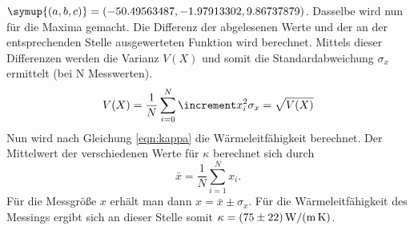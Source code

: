 $\symup{(a,b,c)}=(-50.49563487, -1.97913302, 9.86737879)$.
Dasselbe wird nun für die Maxima gemacht.
Die Differenz der abgelesenen Werte und der an der entsprechenden Stelle ausgewerteten Funktion wird berechnet. 
Mittels dieser Differenzen werden die Varianz $V(X)$ und somit die Standardabweichung $\sigma_x$ ermittelt (bei N Messwerten). 
\begin{equation*}
V(X)= \frac{1}{N} \sum_{i=0}^N \increment x_i ^2 \\
\sigma_x = \sqrt{V(X)} 
\end{equation*}
Nun wird nach Gleichung \eqref{eqn:kappa} die Wärmeleitfähigkeit berechnet. 
Der Mittelwert der verschiedenen Werte für $\kappa$ berechnet sich durch 
\begin{equation}
\bar{x} = \frac{1}{N} \sum_{i=1}^N x_i .
\label{eqn:average}
\end{equation}
Für die Messgröße $x$ erhält man dann $x = \bar{x} \pm \sigma_x$.
Für die Wärmeleitfähigkeit des Messings ergibt sich an dieser Stelle somit $\kappa = \SI{75 \pm 22}{\watt\per\meter\per\kelvin} $.

